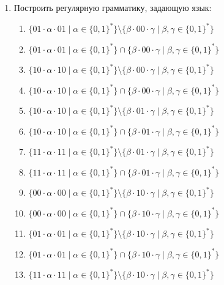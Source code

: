 \documentclass[12pt]{article}
\begin{document}
\begin{enumerate}
  \item Построить регулярную грамматику, задающую язык:
  \begin{enumerate}[label=\arabic*)]
    \setlength\itemsep{0.8em}
    \item $\{ 01 \cdot \alpha \cdot 01 \mid \alpha \in \{0, 1\}^* \} \setminus \{ \beta \cdot 00 \cdot \gamma \mid \beta, \gamma \in \{0, 1\}^*\}$
    \item $\{ 01 \cdot \alpha \cdot 01 \mid \alpha \in \{0, 1\}^* \} \cap      \{ \beta \cdot 00 \cdot \gamma \mid \beta, \gamma \in \{0, 1\}^*\}$
    \item $\{ 10 \cdot \alpha \cdot 10 \mid \alpha \in \{0, 1\}^* \} \setminus \{ \beta \cdot 00 \cdot \gamma \mid \beta, \gamma \in \{0, 1\}^*\}$
    \item $\{ 10 \cdot \alpha \cdot 10 \mid \alpha \in \{0, 1\}^* \} \cap      \{ \beta \cdot 00 \cdot \gamma \mid \beta, \gamma \in \{0, 1\}^*\}$
    \item $\{ 10 \cdot \alpha \cdot 10 \mid \alpha \in \{0, 1\}^* \} \setminus \{ \beta \cdot 01 \cdot \gamma \mid \beta, \gamma \in \{0, 1\}^*\}$
    \item $\{ 10 \cdot \alpha \cdot 10 \mid \alpha \in \{0, 1\}^* \} \cap      \{ \beta \cdot 01 \cdot \gamma \mid \beta, \gamma \in \{0, 1\}^*\}$
    \item $\{ 11 \cdot \alpha \cdot 11 \mid \alpha \in \{0, 1\}^* \} \setminus \{ \beta \cdot 01 \cdot \gamma \mid \beta, \gamma \in \{0, 1\}^*\}$
    \item $\{ 11 \cdot \alpha \cdot 11 \mid \alpha \in \{0, 1\}^* \} \cap      \{ \beta \cdot 01 \cdot \gamma \mid \beta, \gamma \in \{0, 1\}^*\}$
    \item $\{ 00 \cdot \alpha \cdot 00 \mid \alpha \in \{0, 1\}^* \} \setminus \{ \beta \cdot 10 \cdot \gamma \mid \beta, \gamma \in \{0, 1\}^*\}$
    \item $\{ 00 \cdot \alpha \cdot 00 \mid \alpha \in \{0, 1\}^* \} \cap      \{ \beta \cdot 10 \cdot \gamma \mid \beta, \gamma \in \{0, 1\}^*\}$
    \item $\{ 01 \cdot \alpha \cdot 01 \mid \alpha \in \{0, 1\}^* \} \setminus \{ \beta \cdot 10 \cdot \gamma \mid \beta, \gamma \in \{0, 1\}^*\}$
    \item $\{ 01 \cdot \alpha \cdot 01 \mid \alpha \in \{0, 1\}^* \} \cap      \{ \beta \cdot 10 \cdot \gamma \mid \beta, \gamma \in \{0, 1\}^*\}$
    \item $\{ 11 \cdot \alpha \cdot 11 \mid \alpha \in \{0, 1\}^* \} \setminus \{ \beta \cdot 10 \cdot \gamma \mid \beta, \gamma \in \{0, 1\}^*\}$

\end{enumerate}
\end{enumerate}
\end{document}
